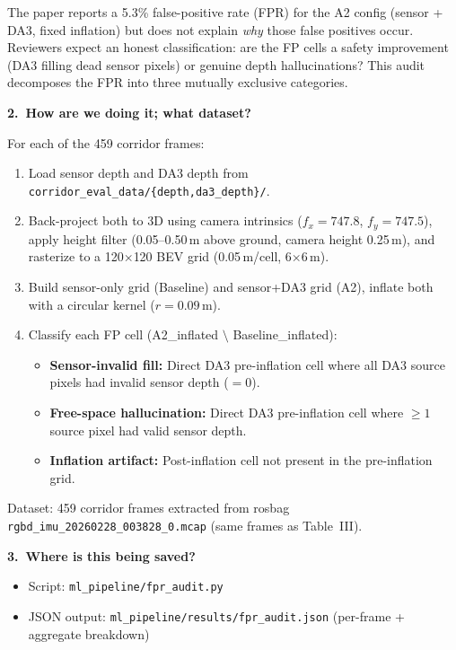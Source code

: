 \documentclass[11pt,a4paper]{article}
\begin{document}
The paper reports a 5.3\% false-positive rate (FPR) for the A2 config
(sensor + DA3, fixed inflation) but does not explain \emph{why} those
false positives occur. Reviewers expect an honest classification: are
the FP cells a safety improvement (DA3 filling dead sensor pixels) or
genuine depth hallucinations? This audit decomposes the FPR into three
mutually exclusive categories.

\textbf{2.\ How are we doing it; what dataset?}

For each of the 459 corridor frames:
\begin{enumerate}[nosep]
  \item Load sensor depth and DA3 depth from
    \texttt{corridor\_eval\_data/\{depth,da3\_depth\}/}.
  \item Back-project both to 3D using camera intrinsics ($f_x\!=\!747.8$,
    $f_y\!=\!747.5$), apply height filter (0.05--0.50\,m above ground,
    camera height 0.25\,m), and rasterize to a 120$\times$120 BEV grid
    (0.05\,m/cell, 6$\times$6\,m).
  \item Build sensor-only grid (Baseline) and sensor+DA3 grid (A2),
    inflate both with a circular kernel ($r = 0.09$\,m).
  \item Classify each FP cell (A2\_inflated $\setminus$ Baseline\_inflated):
    \begin{itemize}[nosep]
      \item \textbf{Sensor-invalid fill:} Direct DA3 pre-inflation cell
        where all DA3 source pixels had invalid sensor depth ($= 0$).
      \item \textbf{Free-space hallucination:} Direct DA3 pre-inflation
        cell where $\geq 1$ source pixel had valid sensor depth.
      \item \textbf{Inflation artifact:} Post-inflation cell not present
        in the pre-inflation grid.
    \end{itemize}
\end{enumerate}

Dataset: 459 corridor frames extracted from rosbag
\texttt{rgbd\_imu\_20260228\_003828\_0.mcap} (same frames as Table~III).

\textbf{3.\ Where is this being saved?}

\begin{itemize}[nosep]
  \item Script: \texttt{ml\_pipeline/fpr\_audit.py}
  \item JSON output: \texttt{ml\_pipeline/results/fpr\_audit.json}
    (per-frame + aggregate breakdown)
\end{itemize}
\end{document}
